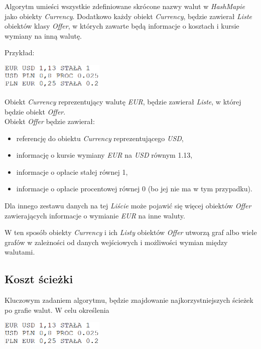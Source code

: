 \documentclass[a4paper,11pt]{article}
\begin{document}
Algorytm umieści wszystkie zdefiniowane skrócone nazwy walut w \textit{HashMapie} jako obiekty \textit{Currency}. Dodatkowo każdy obiekt \textit{Currency}, będzie zawierał \textit{Liste} obiektów klasy \textit{Offer}, w których zawarte będą informacje o kosztach i kursie wymiany na inną walutę.

Przykład:
\begin{center}
\includegraphics[width = 5cm]{Przyklad}
\end{center}

Obiekt \textit{Currency} reprezentujący walutę \textit{EUR}, będzie zawierał \textit{Liste}, w której będzie obiekt \textit{Offer}.
\\Obiekt \textit{Offer} będzie zawierał:
\begin{itemize}
\item referencję do obiektu \textit{Currency} reprezentującego \textit{USD},
\item informację o kursie wymiany \textit{EUR} na \textit{USD} równym 1.13,
\item informacje o opłacie stałej równej 1,
\item informacje o opłacie procentowej równej 0 (bo jej nie ma w tym przypadku).
\end{itemize} 

Dla innego zestawu danych na tej \textit{Liście} może pojawić się więcej obiektów \textit{Offer} zawierających informacje o wymianie \textit{EUR} na inne waluty.

W ten sposób obiekty \textit{Currency} i ich \textit{Listy} obiektów \textit{Offer} utworzą graf albo wiele grafów w zależności od danych wejściowych i możliwości wymian między walutami.

\subsection{Koszt ścieżki}
Kluczowym zadaniem algorytmu, będzie znajdowanie najkorzystniejszych ścieżek po grafie walut. W celu określenia
\begin{center}
\includegraphics[width = 5cm]{Przyklad}
\end{center}
\end{document}
